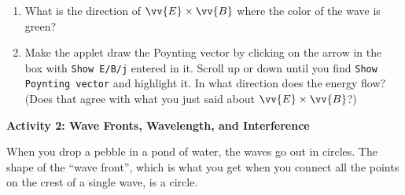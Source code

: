 \begin{enumerate}[labparts]
\item What is the direction of $\vv {E} \times \vv {B}$ where the color of the wave is green?
\answerspace{1.0cm}

\item Make the applet draw the Poynting vector by clicking on the arrow in the box with 
\texttt{Show E/B/j} entered in it. Scroll up or down until you find
\texttt{Show Poynting vector} and highlight it.
In what direction does the energy flow?  (Does that agree with what you just said about $\vv {E} \times \vv {B}$?)
\answerspace{1.0cm}

\end{enumerate}

\textbf{Activity 2: Wave Fronts, Wavelength, and Interference}


When you drop a pebble in a pond of water, the waves go out in circles. The shape of the ``wave front'', which is what you get when you connect all the points on the crest of a single wave, is a circle.   

